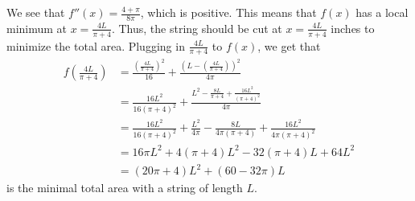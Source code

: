 We see that $f''(x) = \frac{4+\pi}{8\pi}$, which is positive. This means that $f(x)$ has a local minimum at $x=\frac{4L}{\pi+4}$. Thus, the string should be cut at $x = \frac{4L}{\pi+4}$ inches to minimize the total area. Plugging in $\frac{4L}{\pi+4}$ to $f(x)$, we get that
\begin{align*}
    f\left(\frac{4L}{\pi+4}\right) & = \frac{\left(\frac{4L}{\pi+4}\right)^2}{16} + \frac{\left(L-\left(\frac{4L}{\pi+4}\right)\right)^2}{4\pi} \\
    & = \frac{16L^2}{16(\pi+4)^2} + \frac{L^2 - \frac{8L}{\pi+4} + \frac{16L^2}{(\pi+4)^2}}{4\pi} \\
    & = \frac{16L^2}{16(\pi+4)^2} + \frac{L^2}{4\pi} - \frac{8L}{4\pi(\pi+4)} + \frac{16L^2}{4\pi(\pi+4)^2}\\
    & = 16\pi L^2 + 4(\pi+4)L^2 - 32(\pi+4)L + 64L^2 \\
    & = (20\pi+4)L^2 + (60-32\pi)L
\end{align*}
is the minimal total area with a string of length $L$.